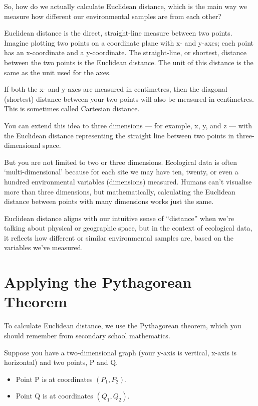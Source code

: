 \documentclass[
  10pt,
]{book}
\providecommand{\tightlist}{%
  \setlength{\itemsep}{0pt}\setlength{\parskip}{0pt}}
\begin{document}
So, how do we actually calculate Euclidean distance, which is the main
way we measure how different our environmental samples are from each
other?

Euclidean distance is the direct, straight-line measure between two
points. Imagine plotting two points on a coordinate plane with x- and
y-axes; each point has an x-coordinate and a y-coordinate. The
straight-line, or shortest, distance between the two points is the
Euclidean distance. The unit of this distance is the same as the unit
used for the axes.

If both the x- and y-axes are measured in centimetres, then the diagonal
(shortest) distance between your two points will also be measured in
centimetres. This is sometimes called Cartesian distance.

You can extend this idea to three dimensions --- for example, x, y, and
z --- with the Euclidean distance representing the straight line between
two points in three-dimensional space.

But you are not limited to two or three dimensions. Ecological data is
often `multi-dimensional' because for each site we may have ten, twenty,
or even a hundred environmental variables (dimensions) measured. Humans
can't visualise more than three dimensions, but mathematically,
calculating the Euclidean distance between points with many dimensions
works just the same.

Euclidean distance aligns with our intuitive sense of ``distance'' when
we're talking about physical or geographic space, but in the context of
ecological data, it reflects how different or similar environmental
samples are, based on the variables we've measured.

\section{Applying the Pythagorean
Theorem}\label{applying-the-pythagorean-theorem}

To calculate Euclidean distance, we use the Pythagorean theorem, which
you should remember from secondary school mathematics.

Suppose you have a two-dimensional graph (your y-axis is vertical,
x-axis is horizontal) and two points, P and Q.

\begin{itemize}
\tightlist
\item
  Point P is at coordinates \((P_1, P_2)\).
\item
  Point Q is at coordinates \((Q_1, Q_2)\).
\end{itemize}
\end{document}
